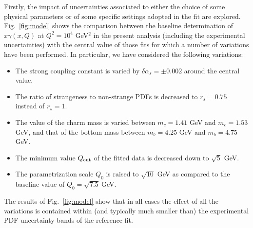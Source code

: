 Firstly, the impact of uncertainties associated to either
the choice of some physical parameters or of some specific settings
adopted in the fit are explored.
%
Fig.~\ref{fig:model} shows the comparison between the baseline
determination of $x\gamma(x,Q)$ at $Q^2=10^4$ GeV$^2$ in the present
analysis (including the experimental uncertainties) with the central
value of those fits for which a number of variations have been
performed.
%
In particular, we have considered the following variations:
\begin{itemize}
\item The strong coupling constant is varied by $\delta \alpha_s=\pm 0.002$ around the central value.
\item The ratio of strangeness to non-strange PDFs is decreased to $r_s=0.75$ instead of $r_s=1$.
\item The value of the charm mass is varied between $m_c=1.41$ GeV and $m_c=1.53$ GeV,
  and that of the bottom mass between $m_b=4.25$ GeV and $m_b=4.75$ GeV.
\item The minimum value $Q_{\rm cut}$ of the fitted data is decreased down to $\sqrt{5}$ GeV.
\item The parametrization scale $Q_0$ is raised to $\sqrt{10}$ GeV as compared
  to the baseline value of $Q_0=\sqrt{7.5}~$GeV.
\end{itemize}
The results of Fig.~\ref{fig:model} show that in all cases the effect
of all the variations is contained within (and typically much smaller than) 
the experimental PDF uncertainty bands of the reference fit.

